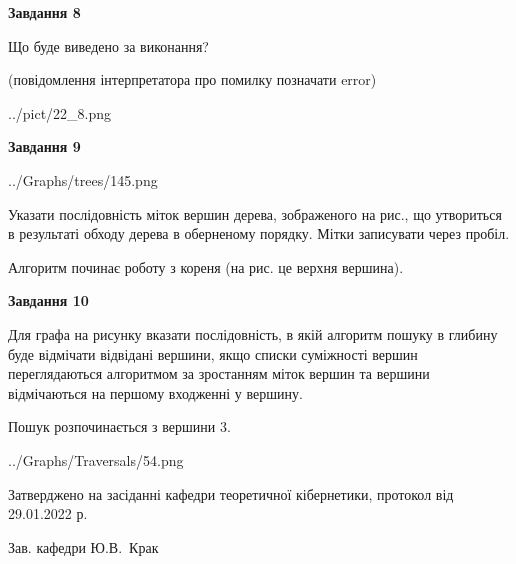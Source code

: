 \documentclass[12pt, ukrainian]{article}
\begin{document}
{\begin {large}
{\begin {center}\textbf{Завдання 8}\end {center}}\par
Що буде виведено за виконання?\par
 (повідомлення інтерпретатора про помилку позначати error)\par
\begin{center}
	{../pict/22_8.png}
\end{center}
\newpage

{\begin {center}\textbf{Завдання 9}\end {center}}\par

\begin{center}
	{../Graphs/trees/145.png}
\end{center}
Указати послідовність міток вершин дерева, зображеного на рис., що утвориться в результаті обходу дерева в оберненому порядку. Мітки записувати через пробіл.\par Алгоритм починає роботу з кореня (на рис. це верхня вершина).\par
\newpage

{\begin {center}\textbf{Завдання 10}\end {center}}\par
Для графа на рисунку вказати послідовність, в якій алгоритм пошуку в глибину буде відмічати відвідані вершини, якщо списки суміжності вершин переглядаються алгоритмом за зростанням міток вершин та вершини відмічаються на першому вход\-женні у вершину.\par
Пошук розпочинається з вершини 3.\par

\begin{center}
	{../Graphs/Traversals/54.png}
\end{center}\par
\newpage


\end {large}
}
{\smallskip \begin {small} Затверджено на засіданні кафедри теоретичної кібернетики, протокол  від   29.01.2022 р.\par\smallskip\smallskip
{\parbox {6.5 cm}{Зав. кафедри \dotfill Ю.В.~Крак}} \end{small}}
\end{document}
